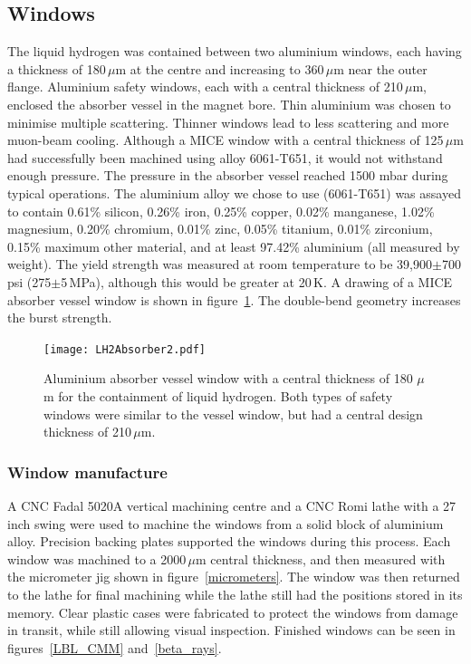 \subsection{Windows}
\label{SubSect:AbsorberVessel:Wndws}

The liquid hydrogen was contained between two aluminium
windows, each having a thickness of 180\,$\mu$m at the centre and
increasing to 360\,$\mu$m near the outer flange. 
Aluminium safety windows, each with a central thickness of 210\,$\mu$m,
enclosed the absorber vessel in the magnet bore.  
Thin aluminium was chosen to minimise multiple scattering.
Thinner windows lead to less scattering
and more muon-beam cooling.
Although a MICE window with a central thickness of 125\,$\mu$m had
successfully been machined using alloy 6061-T651, it  would not withstand
enough pressure. 
The pressure in the absorber vessel reached 1500 mbar during typical operations.
The aluminium alloy we chose to use (6061-T651) was assayed to contain 
 0.61\% silicon, 
 0.26\% iron,
 0.25\% copper,
 0.02\% manganese,
 1.02\% magnesium,
 0.20\% chromium,
 0.01\% zinc, 
 0.05\% titanium,
 0.01\% zirconium, 
 0.15\% maximum other material, 
and at least 97.42\% aluminium (all measured by weight). 
The yield strength was measured at room temperature to be
39,900$\pm$700\,psi (275$\pm$5\,MPa),   
although this would be greater at 20\,K. 
A drawing of a MICE absorber vessel window is shown in
figure~\ref{AbsorberWindow}. 
The double-bend geometry increases the burst strength.

\begin{figure}
  \centerline{\texttt{[image: LH2Absorber2.pdf]}}
  \caption{
    Aluminium absorber vessel window with a central thickness of 180 $\mu$m
    for the containment of liquid hydrogen. 
    Both types of safety windows were similar to the vessel window,
  but had a central design thickness of 210\,$\mu$m.
  } 
  \label{AbsorberWindow}
\end{figure}

\subsubsection{Window manufacture}

A CNC Fadal 5020A vertical machining centre and a CNC Romi lathe with
a 27 inch swing were used to machine the windows from a solid block of
aluminium alloy. 
Precision backing plates supported the windows during this process.
Each window was machined to a 2000\,$\mu$m central thickness, and then
measured with the micrometer jig shown in figure~\ref{micrometers}. 
The window was then returned to the lathe for final machining while the
lathe still had the positions stored in its memory.
Clear plastic cases were fabricated to protect the windows from damage
in transit, while still allowing visual inspection.
Finished windows can be seen in figures~\ref{LBL_CMM}
and~\ref{beta_rays}. 

